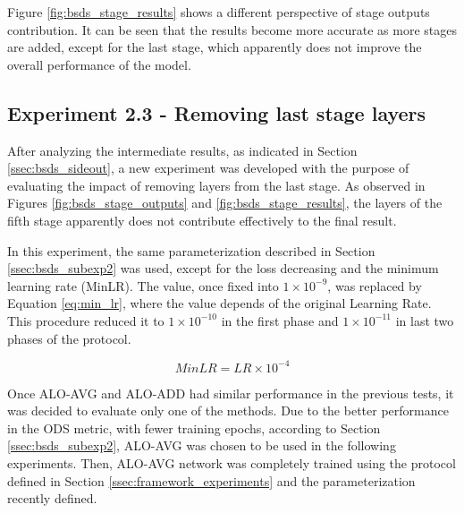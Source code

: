 
Figure \ref{fig:bsds_stage_results} shows a different perspective of stage outputs contribution.
It can be seen that the results become more accurate as more stages are added, except for the last stage, which apparently does not improve the overall performance of the model.

\subsection{Experiment 2.3 - Removing last stage layers}
\label{ssec:bsds_subexp3}

After analyzing the intermediate results, as indicated in Section \ref{ssec:bsds_sideout}, a new experiment was developed with the purpose of evaluating the impact of removing layers from the last stage.
As observed in Figures \ref{fig:bsds_stage_outputs} and \ref{fig:bsds_stage_results}, the layers of the fifth stage apparently does not contribute effectively to the final result.

In this experiment, the same parameterization described in Section \ref{ssec:bsds_subexp2} was used, except for the loss decreasing and the minimum learning rate (MinLR).
The value, once fixed into $1 \times 10^{-9}$, was replaced by Equation \ref{eq:min_lr}, where the value depends of the original Learning Rate.
This procedure reduced it to $1 \times 10^{-10}$ in the first phase and $1 \times 10^{-11}$ in last two phases of the protocol.

\begin{equation}
  MinLR = LR \times 10^{-4}
  \label{eq:min_lr}
\end{equation}

Once ALO-AVG and ALO-ADD had similar performance in the previous tests, it was decided to evaluate only one of the methods.
Due to the better performance in the ODS metric, with fewer training epochs, according to Section \ref{ssec:bsds_subexp2}, ALO-AVG was chosen to be used in the following experiments.
Then, ALO-AVG network was completely trained using the protocol defined in Section \ref{ssec:framework_experiments} and the parameterization recently defined.

